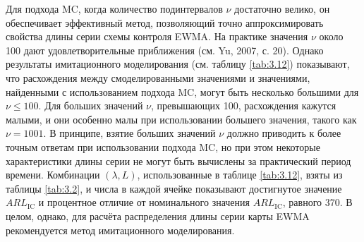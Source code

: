 Для подхода MC, когда количество подинтервалов \(\nu\) достаточно велико, он обеспечивает эффективный метод, позволяющий точно аппроксимировать свойства длины серии схемы контроля EWMA. На практике значения \(\nu\) около 100 дают удовлетворительные приближения (см. Yu, 2007, с. 20). Однако результаты имитационного моделирования (см. таблицу \ref{tab:3.12}) показывают, что расхождения между смоделированными значениями и значениями, найденными с использованием подхода MC, могут быть несколько большими для \(\nu \leq 100\). Для больших значений \(\nu\), превышающих 100, расхождения кажутся малыми, и они особенно малы при использовании большего значения, такого как \(\nu = 1001\). В принципе, взятие больших значений \(\nu\) должно приводить к более точным ответам при использовании подхода MC, но при этом некоторые характеристики длины серии не могут быть вычислены за практический период времени. Комбинации \((\lambda, L)\), использованные в таблице \ref{tab:3.12}, взяты из таблицы \ref{tab:3.2}, и числа в каждой ячейке показывают достигнутое значение \(ARL_{\text{IC}}\) и процентное отличие от номинального значения \(ARL_{\text{IC}}\), равного 370. В целом, однако, для расчёта распределения длины серии карты EWMA рекомендуется метод имитационного моделирования.

